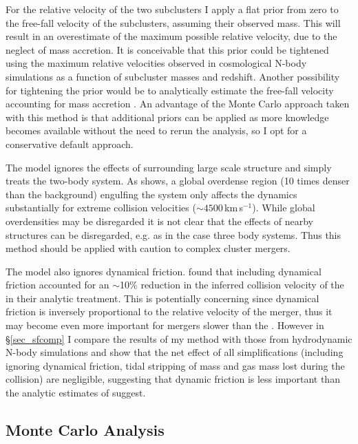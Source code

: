 \documentclass[12pt]{emulateapj}
\begin{document}
For the relative velocity of the two subclusters I apply a flat prior from zero to the free-fall velocity of the subclusters, assuming their observed mass.
This will result in an overestimate of the maximum possible relative velocity, due to the neglect of mass accretion.
It is conceivable that this prior could be tightened using the maximum relative velocities observed in cosmological N-body simulations as a function of subcluster masses and redshift. 
Another possibility for tightening the prior would be to analytically estimate the free-fall velocity accounting for mass accretion \citep[e.g.][]{Angus:2007em}.
An advantage of the Monte Carlo approach taken with this method is that additional priors can be applied as more knowledge becomes available without the need to rerun the analysis, so I opt for a conservative default approach.

The model ignores the effects of surrounding large scale structure and simply treats the two-body system.
As \citet{Nusser:2008iw} shows, a global overdense region (10 times denser than the background) engulfing the system only affects the dynamics substantially for extreme collision velocities ($\sim 4500$\,km\,s$^{-1}$).  While global overdensities may be disregarded it is not clear that the effects of nearby structures can be disregarded, e.g. as in the case three body systems.  Thus this method should be applied with caution to complex cluster mergers.

The model also ignores dynamical friction.
\citet{Farrar:2007fc} found that including dynamical friction accounted for an $\sim$10\% reduction in the inferred collision velocity of the  in their analytic treatment.
This is potentially concerning since dynamical friction is inversely proportional to the relative velocity of the merger, thus it may become even more important for mergers slower than the .
However in \S \ref{sec_sfcomp} I compare the results of my method with those from hydrodynamic N-body simulations and show that the net effect of all simplifications (including ignoring dynamical friction, tidal stripping of mass and gas mass lost during the collision) are negligible, suggesting that dynamic friction is less important than the analytic estimates of \citet{Farrar:2007fc} suggest.
 

\subsection{Monte Carlo Analysis}\label{sec_MCanalysis}
\end{document}
